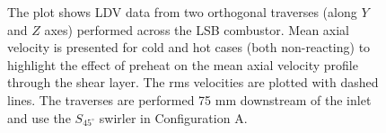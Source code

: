 \begin{figure}[h]

\centering



\caption[Effect of preheat temperature on the LSB flow field - IV]{The plot shows LDV data from two orthogonal traverses (along \(Y\) and \(Z\) axes) performed across the LSB combustor. Mean axial velocity is presented for cold and hot cases (both non-reacting) to highlight the effect of preheat on the mean axial velocity profile through the shear layer. The rms velocities are plotted with dashed lines. The traverses are performed 75 mm downstream of the inlet and use the \(S_{45^\circ}\) swirler in Configuration A.}

\label{fig:temperatureLDVTransverse3}

\end{figure}


